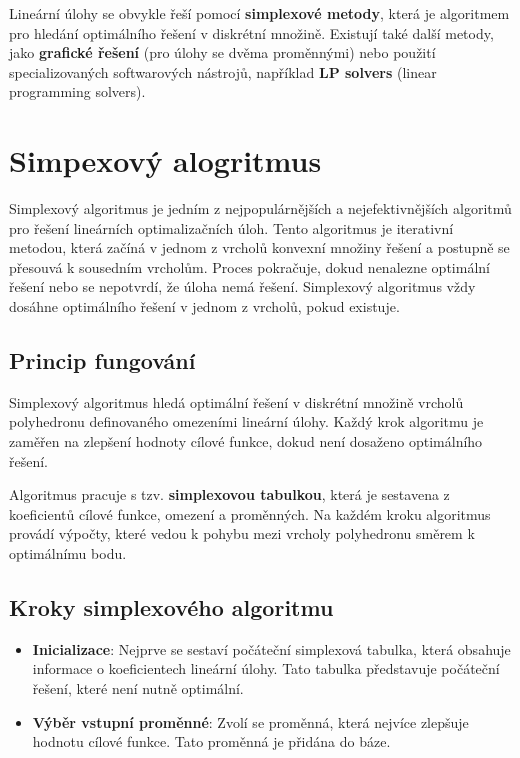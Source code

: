 \documentclass[
12pt,
a4paper,
pdftex,
czech,
titlepage
]{report}
\begin{document}
\begin{itemize}[label={}]
Lineární úlohy se obvykle řeší pomocí \textbf{simplexové metody}, která je algoritmem pro hledání optimálního řešení v diskrétní množině. Existují také další metody, jako \textbf{grafické řešení} (pro úlohy se dvěma proměnnými) nebo použití specializovaných softwarových nástrojů, například \textbf{LP solvers} (linear programming solvers).

\section{Simpexový alogritmus}


Simplexový algoritmus je jedním z nejpopulárnějších a nejefektivnějších algoritmů pro řešení lineárních optimalizačních úloh. Tento algoritmus je iterativní metodou, která začíná v jednom z vrcholů konvexní množiny řešení a postupně se přesouvá k sousedním vrcholům. Proces pokračuje, dokud nenalezne optimální řešení nebo se nepotvrdí, že úloha nemá řešení. Simplexový algoritmus vždy dosáhne optimálního řešení v jednom z vrcholů, pokud existuje.

\subsection*{Princip fungování}

Simplexový algoritmus hledá optimální řešení v diskrétní množině vrcholů polyhedronu definovaného omezeními lineární úlohy. Každý krok algoritmu je zaměřen na zlepšení hodnoty cílové funkce, dokud není dosaženo optimálního řešení.

Algoritmus pracuje s tzv. \textbf{simplexovou tabulkou}, která je sestavena z koeficientů cílové funkce, omezení a proměnných. Na každém kroku algoritmus provádí výpočty, které vedou k pohybu mezi vrcholy polyhedronu směrem k optimálnímu bodu.

\subsection*{Kroky simplexového algoritmu}

\begin{itemize}
    \item \textbf{Inicializace}: Nejprve se sestaví počáteční simplexová tabulka, která obsahuje informace o koeficientech lineární úlohy. Tato tabulka představuje počáteční řešení, které není nutně optimální.
    
    \item \textbf{Výběr vstupní proměnné}: Zvolí se proměnná, která nejvíce zlepšuje hodnotu cílové funkce. Tato proměnná je přidána do báze.
    

\end{itemize}
\end{itemize}
\end{document}
